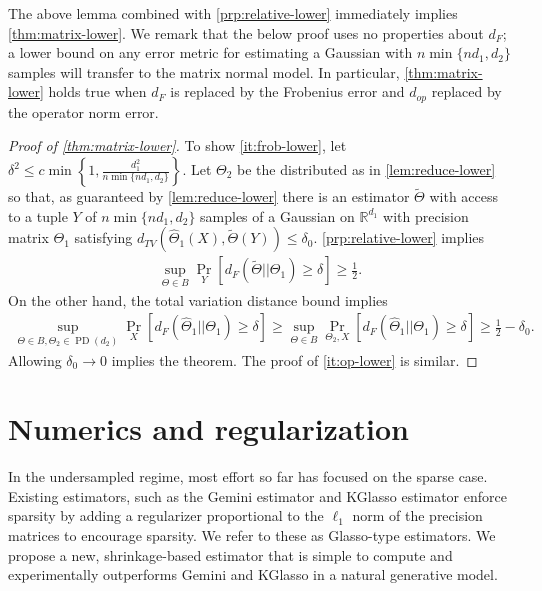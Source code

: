 \documentclass[aos]{imsart}
\theoremstyle{definition}
\numberwithin{equation}{section}
\DeclareMathOperator{\PD}{PD}
\newcommand{\R}{{\mathbb{R}}}
\newcommand{\htheta}{\widehat{\Theta}}
\newcommand{\CF}[1]{{\color{purple}[CF: #1]}}
\begin{document}
The above lemma combined with \cref{prp:relative-lower} immediately implies \cref{thm:matrix-lower}. We remark that the below proof uses no properties about $d_F$; a lower bound on any error metric for estimating a Gaussian with $n \min \{n d_1, d_2\}$ samples will transfer to the matrix normal model. In particular, \cref{thm:matrix-lower} holds true when $d_F$ is replaced by the Frobenius error and $d_{op}$ replaced by the operator norm error.
\begin{proof}[Proof of \cref{thm:matrix-lower}] 

To show \cref{it:frob-lower}, let $\delta^2 \leq c\min \left\{1,\frac{d_1^2}{n \min \{n d_1, d_2\}}\right\}$. Let $\Theta_2$ be the distributed as in \cref{lem:reduce-lower} so that, as guaranteed by \cref{lem:reduce-lower} there is an estimator $\tilde{\Theta}$ with access to a tuple $Y$ of $n \min \{n d_1, d_2\}$ samples of a Gaussian on $\R^{d_1}$ with precision matrix $\Theta_1$ satisfying $d_{TV} (\htheta_1(X), \tilde{\Theta}(Y)) \leq \delta_0$. \cref{prp:relative-lower} implies \begin{align*}
\sup_{\Theta \in B} \Pr_Y\left[ d_F(\tilde{\Theta}|| \Theta_1)  \geq \delta\right] \geq \frac{1}{2}.
\end{align*}
On the other hand, the total variation distance bound implies 
\begin{align*}
\sup_{\Theta \in B, \Theta_2 \in \PD(d_2)} \Pr_{X} \left[ d_F(\htheta_1|| \Theta_1) \geq \delta \right] \geq \sup_{\Theta \in B} \Pr_{\Theta_2, X}\left[ d_F(\htheta_1|| \Theta_1)  \geq \delta\right] \geq \frac{1}{2} - \delta_0.
\end{align*}
Allowing $\delta_0 \to 0$ implies the theorem. The proof of \cref{it:op-lower} is similar.
\end{proof}



\section{Numerics and regularization}\label{sec:numerics}

In the undersampled regime, most effort so far has focused on the sparse case. Existing estimators, such as the Gemini estimator \cite{zhou2014gemini} and KGlasso estimator \cite{tsiligkaridis2013convergence} enforce sparsity by adding a regularizer proportional to the $\ell_1$ norm of the precision matrices to encourage sparsity. We refer to these as Glasso-type estimators. We propose a new, shrinkage-based estimator that is simple to compute and experimentally outperforms Gemini and KGlasso in a natural generative model. 
\end{document}
